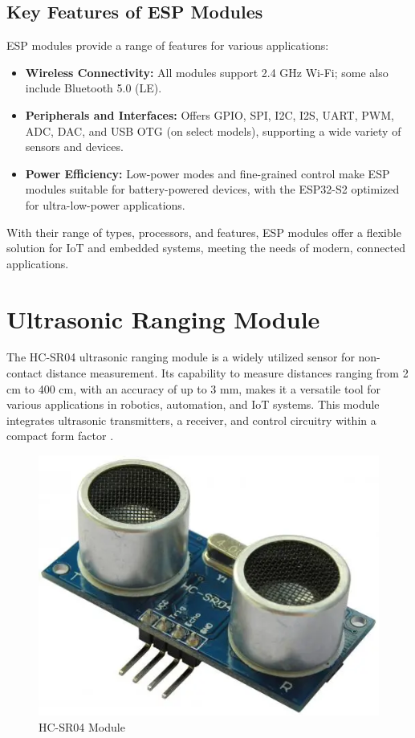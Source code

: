 \subsection{Key Features of ESP Modules}

ESP modules provide a range of features for various applications:

\begin{itemize}
	\item \textbf{Wireless Connectivity:} All modules support 2.4 GHz Wi-Fi; some also include Bluetooth 5.0 (LE).
	
	\item \textbf{Peripherals and Interfaces:} Offers GPIO, SPI, I2C, I2S, UART, PWM, ADC, DAC, and USB OTG (on select models), supporting a wide variety of sensors and devices.
	
	\item \textbf{Power Efficiency:} Low-power modes and fine-grained control make ESP modules suitable for battery-powered devices, with the ESP32-S2 optimized for ultra-low-power applications.
\end{itemize}

With their range of types, processors, and features, ESP modules offer a flexible solution for IoT and embedded systems, meeting the needs of modern, connected applications.

\section{Ultrasonic Ranging Module}



The HC-SR04 ultrasonic ranging module is a widely utilized sensor for non-contact distance measurement. Its capability to measure distances ranging from 2 cm to 400 cm, with an accuracy of up to 3 mm, makes it a versatile tool for various applications in robotics, automation, and IoT systems. This module integrates ultrasonic transmitters, a receiver, and control circuitry within a compact form factor  \cite{HCSR04Datasheet}.

\begin{figure}
	\centering
	\includegraphics[width=0.4\linewidth]{assets/ch2/ultrasonic}
	\caption{HC-SR04 Module}
	\label{fig:ultrasonic}
\end{figure}


